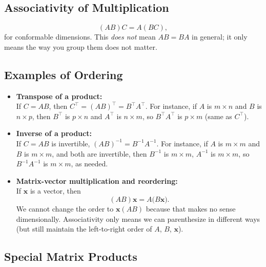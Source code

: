 \subsection{Associativity of Multiplication}
\[
(AB)C = A(BC),
\]
for conformable dimensions. This \emph{does not} mean $AB = BA$ in general; 
it only means the way you group them does not matter.

\subsection{Examples of Ordering}

\begin{itemize}
    \item \textbf{Transpose of a product:}\\
    If $C = AB$, then $C^\top = (AB)^\top = B^\top A^\top$. 
    For instance, if $A$ is $m \times n$ and $B$ is $n \times p$, 
    then $B^\top$ is $p \times n$ and $A^\top$ is $n \times m$, 
    so $B^\top A^\top$ is $p \times m$ (same as $C^\top$).

    \item \textbf{Inverse of a product:}\\
    If $C = AB$ is invertible, $(AB)^{-1} = B^{-1} A^{-1}$. 
    For instance, if $A$ is $m \times m$ and $B$ is $m \times m$, 
    and both are invertible, then $B^{-1}$ is $m \times m$, $A^{-1}$ is $m \times m$, 
    so $B^{-1} A^{-1}$ is $m \times m$, as needed.

    \item \textbf{Matrix-vector multiplication and reordering:}\\
    If $\mathbf{x}$ is a vector, then 
    \[
    (A B) \mathbf{x} = A \bigl( B \mathbf{x} \bigr).
    \]
    We cannot change the order to $\mathbf{x} (A B)$ because that makes no sense dimensionally. 
    Associativity only means we can parenthesize in different ways (but still maintain the left-to-right order of $A$, $B$, $\mathbf{x}$).
\end{itemize}







\subsection{Special Matrix Products}
